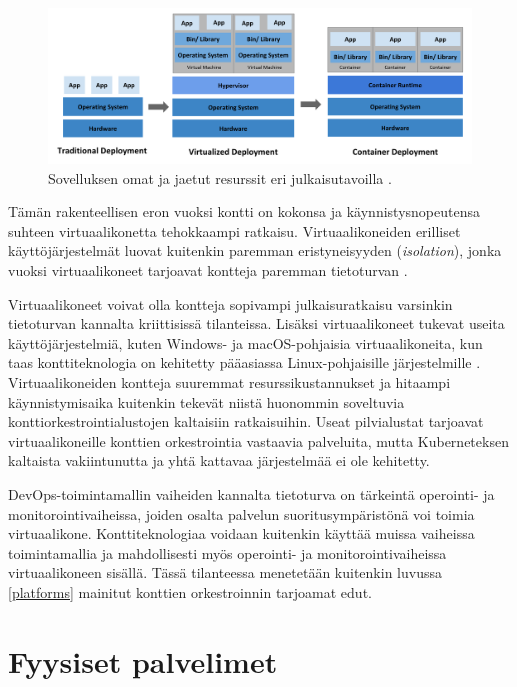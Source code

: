 \begin{figure}[ht]
\begin{center}
\includegraphics[width=1\textwidth]{figures/container_evolution.png}
\caption{Sovelluksen omat ja jaetut resurssit eri julkaisutavoilla \cite{Kubernetes23}\label{fig:container}.}
\end{center}
\end{figure}

\pagebreak

Tämän rakenteellisen eron vuoksi kontti on kokonsa ja käynnistysnopeutensa suhteen virtuaalikonetta tehokkaampi ratkaisu.
Virtuaalikoneiden erilliset käyttöjärjestelmät luovat kuitenkin paremman eristyneisyyden (\textit{isolation}), jonka vuoksi virtuaalikoneet tarjoavat kontteja paremman tietoturvan \cite{Sultan19}.

Virtuaalikoneet voivat olla kontteja sopivampi julkaisuratkaisu varsinkin tietoturvan kannalta kriittisissä tilanteissa.
Lisäksi virtuaalikoneet tukevat useita käyttöjärjestelmiä, kuten Windows- ja macOS-pohjaisia virtuaalikoneita, kun taas konttiteknologia on kehitetty pääasiassa Linux-pohjaisille järjestelmille \cite{Watada19}.
Virtuaalikoneiden kontteja suuremmat resurssikustannukset ja hitaampi käynnistymisaika kuitenkin tekevät niistä huonommin soveltuvia konttiorkestrointialustojen kaltaisiin ratkaisuihin.
Useat pilvialustat tarjoavat virtuaalikoneille konttien orkestrointia vastaavia palveluita, mutta Kuberneteksen kaltaista vakiintunutta ja yhtä kattavaa järjestelmää ei ole kehitetty.

DevOps-toimintamallin vaiheiden kannalta tietoturva on tärkeintä operointi- ja monitorointivaiheissa, joiden osalta palvelun suoritusympäristönä voi toimia virtuaalikone.
Konttiteknologiaa voidaan kuitenkin käyttää muissa vaiheissa toimintamallia ja mahdollisesti myös operointi- ja monitorointivaiheissa virtuaalikoneen sisällä.
Tässä tilanteessa menetetään kuitenkin luvussa \ref{platforms} mainitut konttien orkestroinnin tarjoamat edut.

\section{Fyysiset palvelimet}

